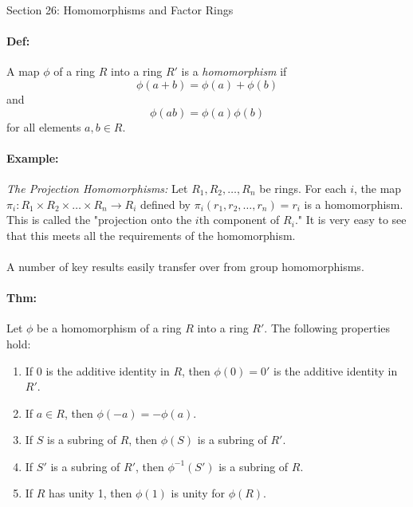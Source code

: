 \documentclass[10pt,a4paper]{article}
\begin{document}
\begin{center}
Section 26: Homomorphisms and Factor Rings
\end{center}

\paragraph{Def:} A map $\phi$ of a ring $R$ into a ring $R'$ is a \textit{homomorphism} if $$ \phi(a+b) = \phi(a)+\phi(b)$$ and $$\phi(ab)=\phi(a)\phi(b)$$ for all elements $a,b \in R$.

\paragraph{Example:} \textit{The Projection Homomorphisms:} Let $R_1, R_2, \dots, R_n$ be rings. For each $i$, the map $\pi_i:R_1 \times R_2 \times \dots \times R_n \to R_i$ defined by $\pi_i(r_1,r_2,\dots,r_n) = r_i$ is a homomorphism. This is called the "projection onto the $i$th component of $R_i$." It is very easy to see that this meets all the requirements of the homomorphism.

\paragraph{}A number of key results easily transfer over from group homomorphisms.

\paragraph{Thm:} Let $\phi$ be a homomorphism of a ring $R$ into a ring $R'$. The following properties hold:
\begin{enumerate}
\item If 0 is the additive identity in $R$, then $\phi(0) = 0'$ is the additive identity in $R'$.\\
\item If $a\in R$, then $\phi(-a) = -\phi(a)$.\\
\item If $S$ is a subring of $R$, then $\phi(S)$ is a subring of $R'$.\\
\item If $S'$ is a subring of $R'$, then $\phi^{-1}(S')$ is a subring of $R$.\\
\item If $R$ has unity 1, then $\phi(1)$ is unity for $\phi(R)$.
\end{enumerate}
\end{document}
